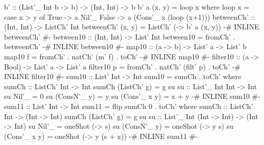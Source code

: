 {\begin{code}
b' :: (List'_ Int b -> b) -> (Int, Int) -> b
b' a (x, y) = loop x
  where loop x = case x > y of
          True -> a Nil'_
          False -> a (Cons'_ x (loop (x+1)))
betweenCh' :: (Int, Int) -> ListCh' Int
betweenCh' (x, y) = ListCh' (\a -> b' a (x, y))
{-# INLINE betweenCh' #-}
between10 :: (Int, Int) -> List' Int
between10 = fromCh' . betweenCh'
{-# INLINE between10 #-}
map10 :: (a -> b) -> List' a -> List' b
map10 f = fromCh' . natCh' (m' f) . toCh'
{-# INLINE map10 #-}
filter10 :: (a -> Bool) -> List' a -> List' a
filter10 p = fromCh' . natCh' (filt' p) . toCh'
{-# INLINE filter10 #-}
sum10 :: List' Int -> Int
sum10 = sumCh . toCh'
  where sumCh :: ListCh' Int -> Int
        sumCh (ListCh' g) = g su
        su :: List'_ Int Int -> Int
        su Nil'_ = 0
        su (ConsN'_ y) = y
        su (Cons'_ x y) = x + y
{-# INLINE sum10 #-}
sum11 :: List' Int -> Int
sum11 = flip sumCh 0 . toCh'
  where sumCh :: ListCh' Int -> (Int -> Int)
        sumCh (ListCh' g) = g su
        su :: List'_ Int (Int -> Int) -> (Int -> Int)
        su Nil'_ = oneShot (\s -> s)
        su (ConsN'_ y) = oneShot (\s -> y s)
        su (Cons'_ x y) = oneShot (\s -> y (s + x))
{-# INLINE sum11 #-}



\end{code}}

